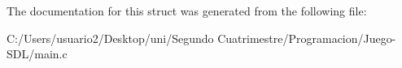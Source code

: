 The documentation for this struct was generated from the following file\+:\begin{DoxyCompactItemize}
\item 
C\+:/\+Users/usuario2/\+Desktop/uni/\+Segundo Cuatrimestre/\+Programacion/\+Juego-\/\+S\+D\+L/main.\+c\end{DoxyCompactItemize}

